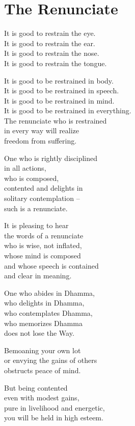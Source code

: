 
\chapter{The Renunciate}


It is good to restrain the eye.\\
It is good to restrain the ear.\\
It is good to restrain the nose.\\
It is good to restrain the tongue.


It is good to be restrained in body.\\
It is good to be restrained in speech.\\
It is good to be restrained in mind.\\
It is good to be restrained in everything.\\
The renunciate who is restrained\\
in every way will realize\\
freedom from suffering.


One who is rightly disciplined\\
in all actions,\\
who is composed,\\
contented and delights in\\
solitary contemplation --\\
such is a renunciate.


It is pleasing to hear\\
the words of a renunciate\\
who is wise, not inflated,\\
whose mind is composed\\
and whose speech is contained\\
and clear in meaning.


One who abides in Dhamma,\\
who delights in Dhamma,\\
who contemplates Dhamma,\\
who memorizes Dhamma\\
does not lose the Way.


Bemoaning your own lot\\
or envying the gains of others\\
obstructs peace of mind.


But being contented\\
even with modest gains,\\
pure in livelihood and energetic,\\
you will be held in high esteem.


